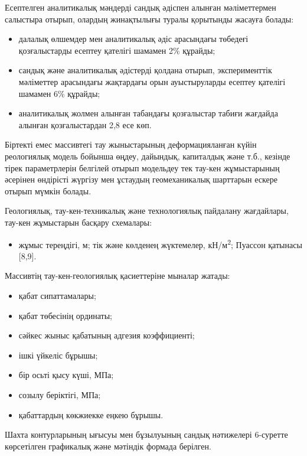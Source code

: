 \begin{multicols}{2}
Есептелген аналитикалық мәндерді сандық әдіспен алынған мәліметтермен
салыстыра отырып, олардың жинақтылығы туралы қорытынды жасауға болады:

\begin{itemize}
\item
  далалық өлшемдер мен аналитикалық әдіс арасындағы төбедеғі
  қозғалыстарды есептеу қателігі шамамен 2\% құрайды;
\item
  сандық және аналитикалық әдістерді қолдана отырып, эксперименттік
  мәліметтер арасындағы жақтардағы орын ауыстыруларды есептеу қателігі
  шамамен 6\% құрайды;
\item
  аналитикалық жолмен алынған табандағы қозғалыстар табиғи жағдайда
  алынған қозғалыстардан 2,8 есе көп.
\end{itemize}

Біртекті емес массивтегі тау жыныстарының деформацияланған күйін
реологиялық модель бойынша өңдеу, дайындық, капиталдық және т.б.,
кезінде тірек параметрлерін белгілей отырып модельдеу тек тау-кен
жұмыстарының әсерінен өндірісті жүргізу мен ұстаудың геомеханикалық
шарттарын ескере отырып мүмкін болады.

Геологиялық, тау-кен-техникалық және технологиялық пайдалану жағдайлары,
тау-кен жұмыстарын басқару схемалары:

\begin{itemize}
\item
  жұмыс тереңдігі, м; тік және көлденең жүктемелер,
  кН/м\textsuperscript{2}; Пуассон қатынасы {[}8,9{]}.
\end{itemize}

Массивтің тау-кен-геологиялық қасиеттеріне мыналар жатады:

\begin{itemize}
\item
  қабат сипаттамалары;
\item
  қабат төбесінің ординаты;
\item
  сәйкес жыныс қабатының адгезия коэффициенті;
\item
  ішкі үйкеліс бұрышы;
\item
  бір осьті қысу күші, МПа;
\item
  созылу беріктігі, МПа;
\item
  қабаттардың көкжиекке еңкею бұрышы.
\end{itemize}

Шахта контурларының ығысуы мен бұзылуының сандық нәтижелері 6-суретте
көрсетілген графикалық және мәтіндік формада берілген.


\end{multicols}
